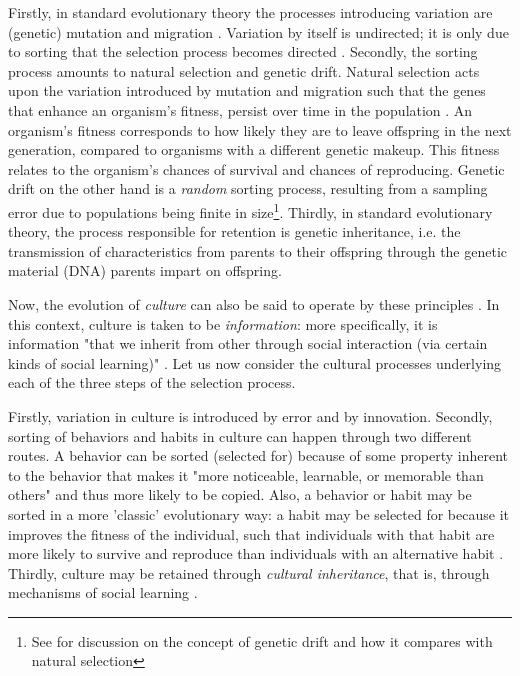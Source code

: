 Firstly, in standard evolutionary theory the processes introducing variation are (genetic) mutation and migration \citep{S-P13}. Variation by itself is undirected; it is only due to sorting that the selection process becomes directed \citep{Donahoe03}.
Secondly, the sorting process amounts to natural selection and genetic drift. Natural selection acts upon the variation introduced by mutation and migration such that the genes that enhance an organism's fitness, persist over time in the population \citep{S-P13}. An organism's fitness corresponds to how likely they are to leave offspring in the next generation, compared to organisms with a different genetic makeup. This fitness relates to the organism's chances of survival and chances of reproducing. 
Genetic drift
on the other hand is a \emph{random} sorting process, resulting from a sampling error due to populations being finite in size\footnote{See \citet{Millstein21} for discussion on the concept of genetic drift and how it compares with natural selection}.
Thirdly, in standard evolutionary theory, the process responsible for retention is genetic inheritance, i.e. the transmission of characteristics from parents to their offspring through the genetic material (DNA) parents impart on offspring.

Now, the evolution of \emph{culture} can also be said to operate by these principles \citep{Heyes18}. In this context, culture is taken to be \emph{information}: more specifically, it is information "that we inherit from other through social interaction (via certain kinds of social learning)" \citep[p.~30]{Heyes18}.
Let us now consider the cultural processes underlying each of the three steps of the selection process.

Firstly, variation in culture is introduced by error and by innovation. 
Secondly, sorting of behaviors and habits in culture can happen through two different routes. A behavior can be sorted (selected for) because of some property inherent to the behavior that makes it "more noticeable, learnable, or memorable than others" \citep[p.~34]{Heyes18}  and thus more likely to be copied. Also, a behavior or habit may be sorted in a more 'classic' evolutionary way: a habit may be selected for because it improves the fitness of the individual, such that individuals with that habit are more likely to survive and reproduce than individuals with an alternative habit .
Thirdly, culture may be retained through \emph{cultural inheritance}, that is, through mechanisms of social learning .

